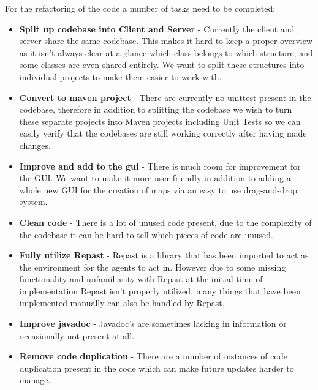 For the refactoring of the code a number of tasks need to be completed:
\begin{itemize}
  \item
  \textbf{Split up codebase into Client and Server} - Currently the client and
  server share the same codebase. This makes it hard to keep a proper overview as
  it isn't always clear at a glance which class belongs to which structure, and
  some classes are even shared entirely. We want to split these structures into
  individual projects to make them easier to work with.
  \item
  \textbf{Convert to \Gls{maven} project} - There are currently no \gls{unittest} present
  in the codebase, therefore in addition to splitting the codebase we wish to
  turn these separate projects into Maven projects including Unit Tests so we can
  easily verify that the codebases are still working correctly after having made
  changes.
  \item
  \textbf{Improve and add to the \gls{gui}} - There is much room for improvement for
  the GUI. We want to make it more user-friendly in addition to adding a whole
  new GUI for the creation of maps via an easy to use drag-and-drop system.
  \item
  \textbf{Clean code} - There is a lot of unused code present, due to the
  complexity of the codebase it can be hard to tell which pieces of code are
  unused.
  \item
  \textbf{Fully utilize Repast} - Repast is a library that has been imported to
  act as the environment for the agents to act in. However due to some missing
  functionality and unfamiliarity with Repast at the initial time of implementation
  Repast isn't properly utilized, many things that have been implemented manually
  can also be handled by Repast.
  \item
  \textbf{Improve \gls{javadoc}} - Javadoc's are sometimes lacking in information or
  occasionally not present at all.
  \item
  \textbf{Remove code duplication} - There are a number of instances of code
  duplication present in the code which can make future updates harder to manage.
\end{itemize}
